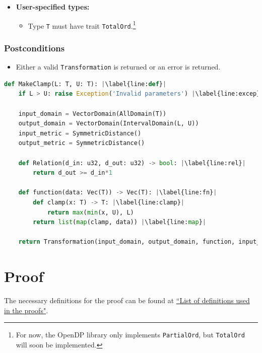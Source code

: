 \documentclass[11pt,a4paper]{article}
\theoremstyle{definition}
\begin{document}
\begin{itemize}
    \item \textbf{User-specified types:}
    \begin{itemize}
        \item Type \texttt{T} must have trait \texttt{TotalOrd}.\footnote{For now, the OpenDP library only implements \texttt{PartialOrd}, but \texttt{TotalOrd} will soon be implemented.}
    \end{itemize}
\end{itemize}

\subsubsection*{Postconditions}
\begin{itemize}
    \item Either a valid \texttt{Transformation} is returned or an error is returned.
\end{itemize}

\begin{lstlisting}[language=Python, escapechar=|] 
def MakeClamp(L: T, U: T): |\label{line:def}|
    if L > U: raise Exception('Invalid parameters') |\label{line:excep}|
    
    input_domain = VectorDomain(AllDomain(T))
    output_domain = VectorDomain(IntervalDomain(L, U))
    input_metric = SymmetricDistance()
    output_metric = SymmetricDistance()
    
    def Relation(d_in: u32, d_out: u32) -> bool: |\label{line:rel}|
        return d_out >= d_in*1
    
    def function(data: Vec(T)) -> Vec(T): |\label{line:fn}|
        def clamp(x: T) -> T: |\label{line:clamp}|
            return max(min(x, U), L)
        return list(map(clamp, data)) |\label{line:map}|
    
    return Transformation(input_domain, output_domain, function, input_metric, output_metric, stability_relation)
\end{lstlisting}


\section{Proof}
The necessary definitions for the proof can be found at \href{https://www.overleaf.com/project/60d214e390b337703d200982}{``List of definitions used in the proofs"}.
\end{document}
